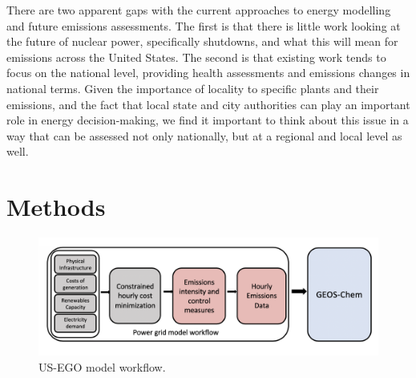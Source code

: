 \documentclass[12]{article}
\begin{document}
There are two apparent gaps with the current approaches to energy modelling and future emissions assessments. The first is that there is little work looking at the future of nuclear power, specifically shutdowns, and what this will mean for emissions across the United States. The second is that existing work tends to focus on the national level, providing health assessments and emissions changes in national terms. Given the importance of locality to specific plants and their emissions, and the fact that local state and city authorities can play an important role in energy decision-making, we find it important to think about this issue in a way that can be assessed not only nationally, but at a regional and local level as well. 


\section{Methods}

\begin{figure}[!htb]
    \centering 
    \includegraphics[scale = .5]{US_EGO_flow.png}
    \caption{US-EGO model workflow.}
    \label{fig:my_label}
\end{figure}
\end{document}
